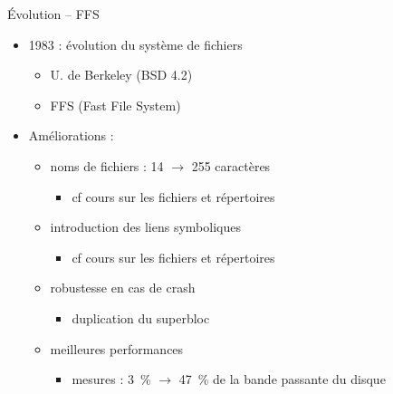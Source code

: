 \begin {frame} {Évolution -- FFS}
    \begin {itemize}
	\item 1983 : évolution du système de fichiers
	    \begin {itemize}
		\item U. de Berkeley (BSD 4.2)
		\item FFS (Fast File System)
	    \end {itemize}
	\item Améliorations :
	    \begin {itemize}
		\item noms de fichiers : 14 $\rightarrow$ 255 caractères
		    \begin {itemize}
			\item cf cours sur les fichiers et répertoires
		    \end {itemize}
		\item introduction des liens symboliques
		    \begin {itemize}
			\item cf cours sur les fichiers et répertoires
		    \end {itemize}
		\item robustesse en cas de crash
		    \begin {itemize}
			\item duplication du superbloc
		    \end {itemize}
		\item meilleures performances
		    \begin {itemize}
			\item mesures : 3~\%
			    $\rightarrow$ 47~\%
			    de la bande passante du disque
		    \end {itemize}
	    \end {itemize}
    \end {itemize}
\end {frame}

